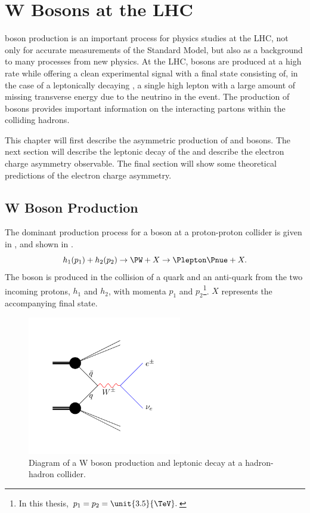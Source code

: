 \chapter{W Bosons at the LHC}
\label{chap:wboson}

\PW boson production is an important process for physics studies at the LHC, not
only for accurate measurements of the Standard Model, but also as a background
to many processes from new physics. 
At the {LHC}, \PW bosons are produced at a high rate while offering a clean
experimental signal with a final state consisting of, in the case of a
leptonically decaying \PW, a single high \PT lepton with a large amount of
missing transverse energy due to the neutrino in the event. 
The production of \PW bosons provides important
information on the interacting partons within the colliding
hadrons\cite{catani,kom}.

This chapter will first describe the asymmetric production of \PWp and \PWm bosons.
The next section will describe the leptonic decay of the \PW and describe the electron
charge asymmetry observable. The final section will show some theoretical
predictions of the electron charge asymmetry.

\section{W Boson Production}

The dominant production process for a \PW boson at a proton-proton collider is
given in ,
and shown in . 
\begin{equation}
  h_1(p_1) + h_2(p_2)
  \to 
  \PW + X
  \to
  \Plepton \Pnue + X.
  \label{wbos:wprod}
\end{equation}
The \PW boson is produced in the collision of a quark and an anti-quark from the
two incoming protons, $h_1$ and $h_2$, with momenta $p_1$ and $p_2$\footnote{In
this thesis, $p_1 = p_2 = \unit{3.5}{\TeV}. $}.  $X$ represents the accompanying
final state.

\begin{figure}[htbp]
  \centering
  \includegraphics[width=0.6\textwidth]{w_production}
  \caption{Diagram of a W boson production and leptonic decay at a hadron-hadron collider.}
  \label{wbos:wproddiag}
\end{figure}

